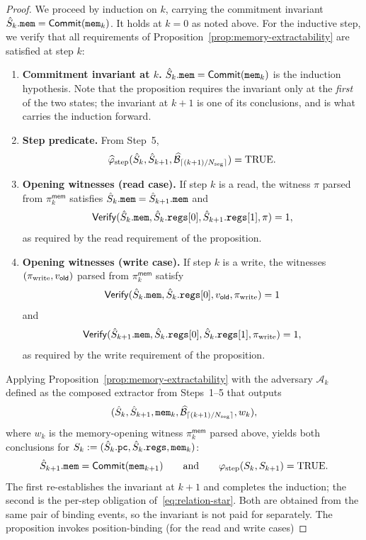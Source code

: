 \begin{proof}
We proceed by induction on $k$, carrying the commitment invariant
$\hat{S}_k.\mathtt{mem}=\mathsf{Commit}(\mathtt{mem}_k)$.  It holds at $k=0$ as noted above.
For the inductive step, we verify that all requirements of
Proposition~\ref{prop:memory-extractability} are satisfied at step $k$:
\begin{enumerate}
  \item \textbf{Commitment invariant at $k$.}
    $\hat{S}_k.\mathtt{mem}=\mathsf{Commit}(\mathtt{mem}_k)$ is the induction hypothesis.
    Note that the proposition requires the invariant only at the \emph{first}
    of the two states; the invariant at $k+1$ is one of its conclusions, and is
    what carries the induction forward.
  \item \textbf{Step predicate.}
    From Step~5,
\[
  \widehat{\varphi}_{\mathrm{step}}(\hat{S}_k,\hat{S}_{k+1},\widehat{\mathcal{B}}_{\lceil(k+1)/N_{\mathrm{seg}}\rceil})=\mathrm{TRUE}.
\]
  \item \textbf{Opening witnesses (read case).}
    If step $k$ is a read, the witness $\pi$ parsed from $\pi^{\mathsf{mem}}_k$
    satisfies $\hat{S}_k.\mathtt{mem}=\hat{S}_{k+1}.\mathtt{mem}$ and
\[
  \mathsf{Verify}(\hat{S}_k.\mathtt{mem},\hat{S}_k.\mathtt{regs}[0],\hat{S}_{k+1}.\mathtt{regs}[1],\pi)=1,
\]
    as required by the read requirement of the proposition.
  \item \textbf{Opening witnesses (write case).}
    If step $k$ is a write, the witnesses $(\pi_{\mathrm{write}},v_{\mathsf{old}})$
    parsed from $\pi^{\mathsf{mem}}_k$ satisfy
\[
  \mathsf{Verify}(\hat{S}_k.\mathtt{mem},\hat{S}_k.\mathtt{regs}[0],v_{\mathsf{old}},\pi_{\mathrm{write}})=1
\]
and
\[
  \mathsf{Verify}(\hat{S}_{k+1}.\mathtt{mem},\hat{S}_k.\mathtt{regs}[0],\hat{S}_k.\mathtt{regs}[1],\pi_{\mathrm{write}})=1,
\]
    as required by the write requirement of the proposition.
\end{enumerate}
Applying Proposition~\ref{prop:memory-extractability} with the adversary
$\mathcal{A}_k$ defined as the composed extractor from Steps~1--5 that outputs
\[
  (\hat{S}_k,\hat{S}_{k+1},\mathtt{mem}_k,\widehat{\mathcal{B}}_{\lceil(k+1)/N_{\mathrm{seg}}\rceil},w_k),
\]
where $w_k$ is the memory-opening witness $\pi^{\mathsf{mem}}_k$ parsed above,
yields both conclusions for $S_k:=(\hat{S}_k.\mathtt{pc},\hat{S}_k.\mathtt{regs},\mathtt{mem}_k)$:
\[
  \hat{S}_{k+1}.\mathtt{mem}=\mathsf{Commit}(\mathtt{mem}_{k+1})
  \qquad\text{and}\qquad
  \varphi_{\mathrm{step}}(S_k,S_{k+1})=\mathrm{TRUE}.
\]
The first re-establishes the invariant at $k+1$ and completes the induction;
the second is the per-step obligation of~\eqref{eq:relation-star}.  Both are
obtained from the same pair of binding events, so the invariant is not paid for
separately.
The proposition invokes position-binding (for the read and write cases)

\end{proof}
